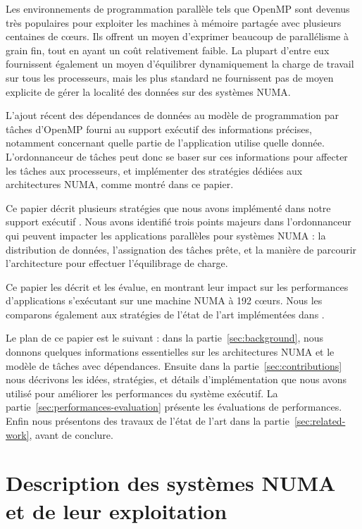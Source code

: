 \documentclass[parallelisme]{compas2016}
\begin{document}
Les environnements de programmation parallèle tels que OpenMP sont devenus très
populaires pour exploiter les machines à mémoire partagée avec plusieurs centaines de cœurs.
Ils offrent un moyen d'exprimer beaucoup de parallélisme à grain fin, tout en
ayant un coût relativement faible. La plupart d'entre eux fournissent également
un moyen d'équilibrer dynamiquement la charge de travail sur tous les processeurs,
mais les plus standard ne fournissent pas de moyen explicite de gérer la localité
des données sur des systèmes NUMA.

L'ajout récent des dépendances de données au modèle de programmation par tâches
d'OpenMP fourni au support exécutif des informations précises, notamment concernant
quelle partie de l'application utilise quelle donnée.
L'ordonnanceur de tâches peut donc se baser sur ces informations pour affecter
les tâches aux processeurs, et implémenter des stratégies dédiées aux architectures
NUMA, comme montré dans ce papier.

Ce papier décrit plusieurs stratégies que nous avons implémenté dans notre support
exécutif \kaapi. Nous avons identifié trois points majeurs dans l'ordonnanceur qui
peuvent impacter les applications parallèles pour systèmes NUMA : la distribution
de données, l'assignation des tâches prête, et la manière de parcourir l'architecture
pour effectuer l'équilibrage de charge.

Ce papier les décrit et les évalue, en montrant leur impact sur les performances
d'applications s'exécutant sur une machine NUMA à 192 cœurs.
Nous les comparons également aux stratégies de l'état de l'art implémentées dans \kaapi.

Le plan de ce papier est le suivant : dans la partie~\ref{sec:background},
nous donnons quelques informations essentielles sur les architectures NUMA et
le modèle de tâches avec dépendances. Ensuite dans la partie~\ref{sec:contributions}
nous décrivons les idées, stratégies, et détails d'implémentation que nous avons
utilisé pour améliorer les performances du système exécutif. La partie~\ref{sec:performances-evaluation}
présente les évaluations de performances. Enfin nous présentons des travaux de l'état
de l'art dans la partie~\ref{sec:related-work}, avant de conclure.


\section{Description des systèmes NUMA et de leur exploitation}
\end{document}
